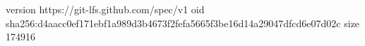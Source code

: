 version https://git-lfs.github.com/spec/v1
oid sha256:d4aacc0ef171ebf1a989d3b4673f2fefa5665f3be16d14a29047dfcd6e07d02c
size 174916
